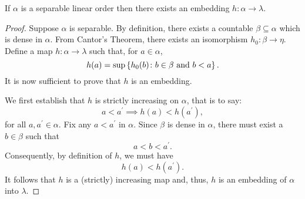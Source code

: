 \begin{prp}[Separability]\label{prp:sep}
	If $\alpha$ is a separable linear order then there exists an embedding
	$h\colon\alpha\to\lambda$.
\end{prp}
\begin{proof}
	Suppose $\alpha$ is separable.  By definition, there exists a countable
	$\beta\subseteq\alpha$ which is dense in $\alpha$.  From Cantor's Theorem, there
	exists an isomorphism $h_{0}\colon\beta\to\eta$. Define a map
	$h\colon\alpha\to\lambda$ such that, for $a\in\alpha$,
	\begin{equation}
		h(a)=\sup\left\lbrace h_{0}(b)\colon b\in\beta\text{ and }b<a \right\rbrace.
	\end{equation}
	It is now sufficient to prove that $h$ is an embedding.

	We first establish that $h$ is strictly increasing on $\alpha$, that is to
	say:
	\begin{equation}
		a<a^{\prime}\implies h(a)<h(a^{\prime}),
	\end{equation}
	for all $a,a^{\prime}\in\alpha$.  Fix any $a<a^{\prime}$ in $\alpha$. Since
	$\beta$ is dense in $\alpha$, there must exist a $b\in\beta$ such that
	\begin{equation}
		a<b<a^{\prime}.
	\end{equation}
	Consequently, by definition of $h$, we must have
	\begin{equation}
		h(a)<h(a^{\prime}).
	\end{equation}
	It follows that $h$ is a (strictly) increasing map and, thus, $h$ is
	an embedding of $\alpha$ into $\lambda$.
\end{proof}

